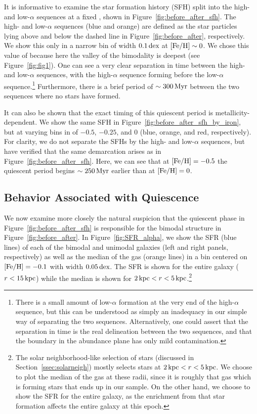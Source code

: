 It is informative to examine the star formation history (SFH) split into the high- and low-$\alpha$ sequences at a fixed \FeH{}, shown in Figure~\ref{fig:before_after_sfh}. The high- and low-$\alpha$ sequences (blue and orange) are defined as the star particles lying above and below the dashed line in Figure~\ref{fig:before_after}, respectively. We show this only in a narrow bin of width $0.1\,\textrm{dex}$ at $[\textrm{Fe}/\textrm{H}]\sim0$. We chose this value of \FeH{} because here the valley of the bimodality is deepest (see Figure~\ref{fig:fig1}). One can see a very clear separation in time between the high- and low-$\alpha$ sequences, with the high-$\alpha$ sequence forming before the low-$\alpha$ sequence.\footnote{There is a small amount of low-$\alpha$ formation at the very end of the high-$\alpha$ sequence, but this can be understood as simply an inadequacy in our simple way of separating the two sequences. Alternatively, one could assert that the separation in time is the real delineation between the two sequences, and that the boundary in the abundance plane has only mild contamination.} Furthermore, there is a brief period of $\sim300\,\textrm{Myr}$ between the two sequences where no stars have formed.

It can also be shown that the exact timing of this quiescent period is metallicity-dependent. We show the same SFH in Figure~\ref{fig:before_after_sfh_by_iron}, but at varying bins in \FeH{} of $-0.5$, $-0.25$, and $0$ (blue, orange, and red, respectively). For clarity, we do not separate the SFHs by the high- and low-$\alpha$ sequences, but have verified that the same demarcation arises as in Figure~\ref{fig:before_after_sfh}. Here, we can see that at $[\textrm{Fe}/\textrm{H}]=-0.5$ the quiescent period begins $\sim250\,\textrm{Myr}$ earlier than at $[\textrm{Fe}/\textrm{H}]=0$.

\subsection{\alphaFe{} Behavior Associated with Quiescence}
We now examine more closely the natural suspicion that the quiescent phase in Figure~\ref{fig:before_after_sfh} is responsible for the bimodal structure in Figure~\ref{fig:before_after}. In Figure~\ref{fig:SFR_alpha}, we show the SFR (blue lines) of each of the bimodal and unimodal galaxies (left and right panels, respectively) as well as the median \MgFe{} of the gas (orange lines) in a bin centered on $[\textrm{Fe}/\textrm{H}]{}=-0.1$ with width $0.05\,\textrm{dex}$. The SFR is shown for the entire galaxy ($r<15\,\textrm{kpc}$) while the median \MgFe{} is shown for $2\,\textrm{kpc}<r<5\,\textrm{kpc}$.\footnote{The solar neighborhood-like selection of stars (discussed in Section~\ref{ssec:solarneigh}) mostly selects stars at $2\,\textrm{kpc}<r<5\,\textrm{kpc}$. We choose to plot the median \MgFe{} of the gas at these radii, since it is roughly that gas which is forming stars that ends up in our sample. On the other hand, we choose to show the SFR for the entire galaxy, as the enrichment from that star formation affects the entire galaxy at this epoch.}

